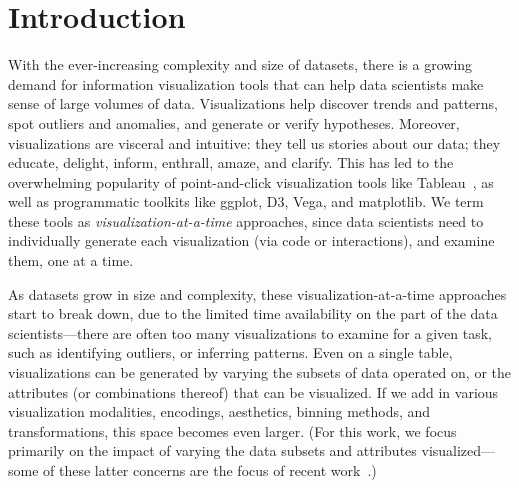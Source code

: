 \section{Introduction}%

\par 
With the ever-increasing complexity 
and size of datasets,
there is a growing demand for 
information visualization tools
that can help data scientists make sense of large
volumes of data.
Visualizations help discover 
trends and patterns, 
spot outliers and anomalies, 
and generate or verify hypotheses.
Moreover, 
visualizations are visceral and intuitive: 
they tell us stories about our data; 
they educate, delight, inform, 
enthrall, amaze, and clarify.
This has led to the overwhelming popularity
of point-and-click visualization tools like Tableau~\cite{Stolte2002},
as well as programmatic toolkits like ggplot, D3, Vega, and matplotlib. 
We term these tools as {\em visualization-at-a-time} approaches, since
data scientists need to individually 
generate each visualization (via code or interactions),
and examine them, 
one at a time.


\par
As datasets grow in size and complexity, 
these visualization-at-a-time approaches start to break down,
due to the limited time availability on the 
part of the data scientists---there 
are often too many visualizations to examine for a given 
task, such as identifying outliers, or inferring patterns. 
Even on a single table, 
visualizations can be generated
by varying the subsets of data operated on, 
or the attributes (or combinations
thereof) that can be visualized. 
If we add in various visualization modalities, encodings,
aesthetics, binning methods, and transformations,
this space becomes even larger. 
(For this work, we focus primarily on
the impact of varying the data subsets
and attributes visualized---some of these
latter concerns are the focus of recent work~\cite{Wongsuphasawat2017}.)

